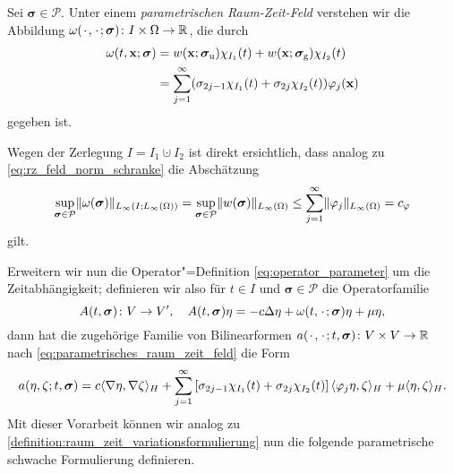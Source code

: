 \documentclass[../main.tex]{subfiles}
\begin{document}
\begin{Definition}
\label{definition:parametrisches_raum_zeit_feld}
    Sei $\bm\sigma \in \mathcal P$.
    Unter einem \emph{parametrischen Raum-Zeit-Feld} verstehen wir die Abbildung
    $\omega({\mkern2mu\cdot\mkern2mu}, {\mkern2mu\cdot\mkern2mu}; \bm\sigma) \colon I \times \Omega \to \mathbb{R}$, die durch
    \begin{equation}
    \label{eq:parametrisches_raum_zeit_feld}
        \begin{aligned}
            \omega(t, \mathbf{x}; \bm\sigma)
            &= w(\mathbf{x}; \bm\sigma_{\text{u}}) \chi_{I_{1}}(t) + w(\mathbf{x}; \bm\sigma_{\text{g}}) \chi_{I_{2}}(t)\\
            &= \sum_{j = 1}^{\infty} (\sigma_{2j-1} \chi_{I_{1}}(t) + \sigma_{2j} \chi_{I_{2}}(t)) \varphi_{j}(\mathbf{x})
        \end{aligned}
    \end{equation}
    gegeben ist.
\end{Definition}

Wegen der Zerlegung $I = I_{1} \cupdot I_{2}$ ist direkt ersichtlich, dass analog zu \cref{eq:rz_feld_norm_schranke} die Abschätzung
\begin{equation}
\label{eq:parametrisches_raum_zeit_feld_schranke}
    \sup_{\bm\sigma \in \mathcal P} \lVert\omega(\bm\sigma)\rVert_{L_{\infty}(I; L_{\infty}(\Omega))}
    = \sup_{\bm\sigma \in \mathcal P} \lVert w(\bm\sigma)\rVert_{L_{\infty}(\Omega)} \leq \sum_{j = 1}^{\infty} \lVert\varphi_{j}\rVert_{L_{\infty}(\Omega)} = c_{\varphi}
\end{equation}
gilt.

Erweitern wir nun die Operator"=Definition \cref{eq:operator_parameter} um die Zeitabhängigkeit; definieren wir also für $t \in I$ und $\bm\sigma \in \mathcal P$ die Operatorfamilie
\begin{equation}
    \label{eq:operator_zeit_parameter}
    A(t, \bm\sigma) \colon V \to V', \quad A(t, \bm\sigma) \eta = -c \Delta \eta + \omega(t, {\mkern2mu\cdot\mkern2mu}; \bm\sigma) \eta + \mu \eta,
\end{equation}
dann hat die zugehörige Familie von Bilinearformen $a({\mkern2mu\cdot\mkern2mu}, {\mkern2mu\cdot\mkern2mu}; t, \bm\sigma) \colon V \times V \to \mathbb{R}$ nach \cref{eq:parametrisches_raum_zeit_feld} die Form
\begin{equation}
    \label{eq:bilinearform_zeit_parameter}
    \begin{aligned}
        a(\eta, \zeta; t, \bm\sigma) = c\langle\nabla \eta,\nabla \zeta\rangle_{H} + \sum_{j = 1}^{\infty} \left[ \sigma_{2j-1} \chi_{I_{1}}(t) + \sigma_{2j} \chi_{I_{2}}(t)  \right] \langle\varphi_{j} \eta,\zeta\rangle_{H} + \mu \langle\eta,\zeta\rangle_{H}.
    \end{aligned}
\end{equation}
Mit dieser Vorarbeit können wir analog zu \cref{definition:raum_zeit_variationsformulierung} nun die folgende parametrische schwache Formulierung definieren.
\end{document}
